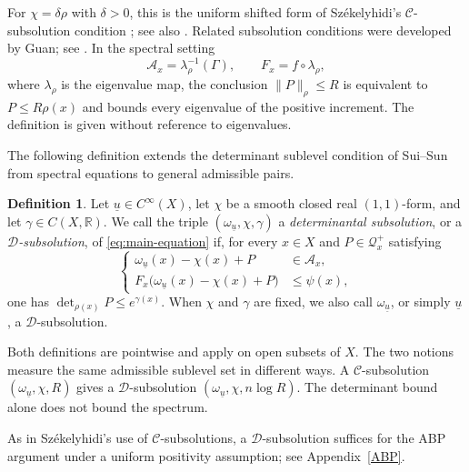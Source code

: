 \documentclass[oneside,english,letterpaper]{amsart}
\numberwithin{equation}{section}
\theoremstyle{plain}
\theoremstyle{definition}
\newtheorem{defn}[thm]{Definition}
\theoremstyle{remark}
\begin{document}
For $\chi=\delta\rho$ with $\delta>0$, this is the uniform shifted
form of Sz\'ekelyhidi's $\mathcal C$-subsolution condition
\cite{MR3807322}; see also
\cite[Definition~1.1]{guo2024uniformlinftyestimatessubsolutions}.
Related subsolution conditions were developed by Guan; see
\cite{MR3284698,MR4727578}.  In the spectral setting
$$
\mathcal A_x=\lambda_\rho^{-1}(\Gamma),
\qquad F_x=f\circ\lambda_\rho,
$$
where $\lambda_\rho$ is the eigenvalue map, the conclusion
$\|P\|_\rho\leq R$ is equivalent to $P\leq R\rho(x)$ and bounds
every eigenvalue of the positive increment. The definition is given without reference to eigenvalues.


The following definition extends the determinant sublevel condition
of Sui--Sun~\cite[condition~(3)]{MR4567566} from spectral equations
to general admissible pairs.

\begin{defn}
	\label{def:D-subsolution}
	Let $\underline u\in C^\infty(X)$, let $\chi$ be a smooth closed real
	$(1,1)$-form, and let $\gamma\in C(X,\mathbb R)$. We call the triple
	$(\omega_{\underline u},\chi,\gamma)$ a \emph{determinantal
		subsolution}, or a \emph{$\mathcal D$-subsolution}, of
	\eqref{eq:main-equation} if, for every $x\in X$ and
	$P\in\mathcal Q_x^+$ satisfying
	\begin{equation}
		\label{eq:D-subsolution-test}
		\left\{
		\begin{aligned}
			\omega_{\underline u}(x)-\chi(x)+P&\in\mathcal A_x,\\
			F_x\bigl(\omega_{\underline u}(x)-\chi(x)+P\bigr)&\leq\psi(x),
		\end{aligned}
		\right.
	\end{equation}
	one has $\det_{\rho(x)}P\leq e^{\gamma(x)}$.
	When $\chi$ and $\gamma$ are fixed, we also call
	$\omega_{\underline u}$, or simply $\underline u$, a
	$\mathcal D$-subsolution.
\end{defn}

Both definitions are pointwise and apply on open subsets of $X$. The two notions measure the same admissible sublevel set in
different ways. A $\mathcal C$-subsolution
$(\omega_{\underline u},\chi,R)$ gives a $\mathcal D$-subsolution
$(\omega_{\underline u},\chi,n\log R)$. The determinant bound
alone does not bound the spectrum.


As in Sz\'ekelyhidi's use of $\mathcal C$-subsolutions, a
$\mathcal D$-subsolution suffices for the ABP argument under a
uniform positivity assumption; see Appendix~\ref{ABP}. 
\end{document}
